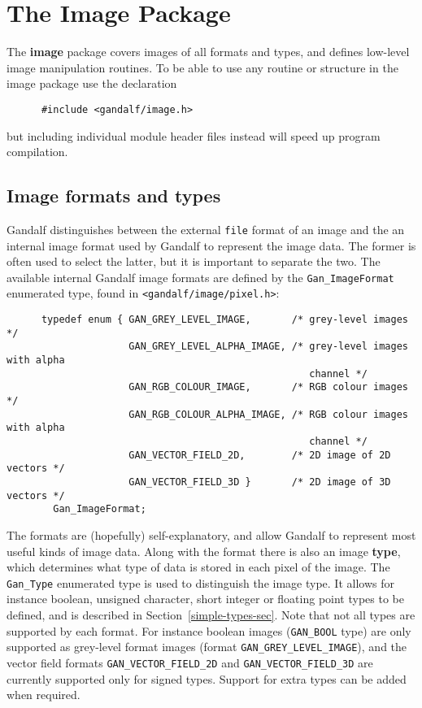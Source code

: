 \chapter{The Image Package} \label{image-chapter}
The {\bf image} package covers images of all formats and types, and defines
low-level image manipulation routines.
To be able to use any routine or structure in the image package
use the declaration
\begin{verbatim}
      #include <gandalf/image.h>
\end{verbatim}
but including individual module header files instead will speed up program
compilation.

\section{Image formats and types} \label{formats-types-sec}
Gandalf distinguishes between the external {\tt file} format of an image
and the an internal image format used by Gandalf to represent the image data.
The former is often used to select the latter, but it is important to
separate the two. The available internal Gandalf image formats are defined
by the {\tt Gan\_ImageFormat} enumerated type, found
in {\tt <gandalf/image/pixel.h>}:
\begin{verbatim}
      typedef enum { GAN_GREY_LEVEL_IMAGE,       /* grey-level images */
                     GAN_GREY_LEVEL_ALPHA_IMAGE, /* grey-level images with alpha
                                                    channel */
                     GAN_RGB_COLOUR_IMAGE,       /* RGB colour images */
                     GAN_RGB_COLOUR_ALPHA_IMAGE, /* RGB colour images with alpha
                                                    channel */
                     GAN_VECTOR_FIELD_2D,        /* 2D image of 2D vectors */
                     GAN_VECTOR_FIELD_3D }       /* 2D image of 3D vectors */
        Gan_ImageFormat;
\end{verbatim}
The formats are (hopefully) self-explanatory, and allow Gandalf to represent
most useful kinds of image data. Along with the format there is also an
image {\bf type}, which determines what type of data is stored in each pixel
of the image. The {\tt Gan\_Type} enumerated type is used to distinguish
the image type. It allows for instance boolean, unsigned character, short
integer or floating point types to be defined, and is described in
Section~\ref{simple-types-sec}.
Note that not all types are supported by each format.
For instance boolean images ({\tt GAN\_BOOL} type) are only supported as
grey-level format images (format {\tt GAN\_GREY\_LEVEL\_IMAGE}), and
the vector field formats {\tt GAN\_VECTOR\_FIELD\_2D} and
{\tt GAN\_VECTOR\_FIELD\_3D} are currently supported only for signed types.
Support for extra types can be added when required.

